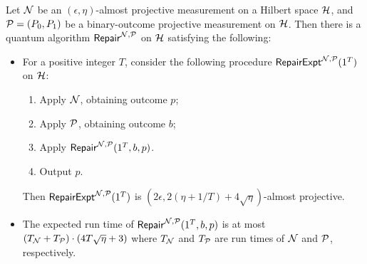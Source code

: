 \begin{lemma}\label{lem:repair}
Let $\mathcal{N}$ be an $(\epsilon,\eta)$-almost projective measurement on a Hilbert space $\mathcal{H}$, and $\mathcal{P}=(P_0,P_1)$ be a binary-outcome projective measurement on $\mathcal{H}$. %
Then there is a quantum algorithm $\mathsf{Repair}^{\mathcal{N},\mathcal{P}}$ on $\mathcal{H}$ satisfying the following: 
\begin{itemize}
\item For a positive integer $T$, consider the following procedure $\mathsf{RepairExpt}^{\mathcal{N},\mathcal{P}}(1^T)$ on $\mathcal{H}$: 
\begin{enumerate}
\item Apply $\mathcal{N}$, obtaining outcome $p$; 
\item Apply $\mathcal{P}$, obtaining outcome $b$;
\item Apply $\mathsf{Repair}^{\mathcal{N},\mathcal{P}}(1^T,b,p)$.
\item Output $p$.
\end{enumerate}
Then $\mathsf{RepairExpt}^{\mathcal{N},\mathcal{P}}(1^T)$ is $(2\epsilon,2(\eta+1/T)+4\sqrt{\eta})$-almost projective.
\item The expected run time of  $\mathsf{Repair}^{\mathcal{N},\mathcal{P}}(1^T,b,p)$ is at most $(T_{\mathcal{N}}+T_{\mathcal{P}})\cdot (4T\sqrt{\eta}+3)$ where  $T_{\mathcal{N}}$ and $T_{\mathcal{P}}$ are run times of $\mathcal{
N}$ and $\mathcal{P}$, respectively. 
\end{itemize}
\end{lemma}

